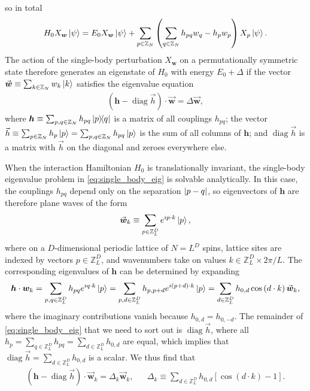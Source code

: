\documentclass[nofootinbib,notitlepage,11pt]{revtex4-2}
\newcommand{\p}[1]{\left(#1\right)} %
\renewcommand{\sp}[1]{\left[#1\right]} %
\renewcommand{\c}{\cdot} %
\newcommand{\m}{\bm} %
\renewcommand{\v}{\vec} %
\newcommand{\1}{\mathds{1}}
\newcommand{\ZZ}{\mathbb{Z}}
\DeclareMathOperator{\diag}{diag}
\begin{document}
so in total
\begin{align}
  H_0 X_{\m w} \ket\psi
  = E_0 X_{\m w} \ket\psi
  + \sum_{p\in\ZZ_N} \p{\sum_{q\in\ZZ_N} h_{pq} w_q - h_p w_p}
  X_p \ket\psi.
  \label{eq:single_body_diagnosis_end}
\end{align}
The action of the single-body perturbation $X_{\m w}$ on a
permutationally symmetric state therefore generates an eigenstate of
$H_0$ with energy $E_0+\Delta$ if the vector
$\v{\m w}\equiv\sum_{k\in\ZZ_N} w_k \ket{k}$ satisfies the eigenvalue
equation
\begin{align}
  \p{\m h - \diag\v h} \c \v{\m w} = \Delta \v{\m w},
  \label{eq:single_body_eig}
\end{align}
where $\m h\equiv\sum_{p,q\in\ZZ_N} h_{pq} \op{p}{q}$ is a matrix of
all couplings $h_{pq}$; the vector
$\v h \equiv \sum_{p\in\ZZ_N} h_p \ket{p} = \sum_{p,q\in\ZZ_N} h_{pq}
\ket{p}$ is the sum of all columns of $\m h$; and $\diag\v h$ is a
matrix with $\v h$ on the diagonal and zeroes everywhere else.

When the interaction Hamiltonian $H_0$ is translationally invariant,
the single-body eigenvalue problem in \eqref{eq:single_body_eig} is
solvable analytically.  In this case, the couplings $h_{pq}$ depend
only on the separation $\abs{p-q}$, so eigenvectors of $\m h$ are
therefore plane waves of the form
\begin{align}
  \v{\m w}_k \equiv \sum_{p\in\ZZ_L^D} e^{ip\c k} \ket{p},
\end{align}
where on a $D$-dimensional periodic lattice of $N=L^D$ spins, lattice
sites are indexed by vectors $p\in\ZZ_L^D$, and wavenumbers take on
values $k\in\ZZ_L^D\times2\pi/L$.  The corresponding eigenvalues of
$\m h$ can be determined by expanding
\begin{align}
  \m h\c{\m w}_k
  = \sum_{p,q\in\ZZ_L^D} h_{pq} e^{iq\c k} \ket{p}
  = \sum_{p,d\in\ZZ_L^D} h_{p,p+d} e^{i\p{p+d}\c k} \ket{p}
  = \sum_{d\in\ZZ_L^D} h_{0,d} \cos\p{d\c k} \v{\m w}_k,
\end{align}
where the imaginary contributions vanish because $h_{0,d}=h_{0,-d}$.
The remainder of \eqref{eq:single_body_eig} that we need to sort out
is $\diag\v h$, where all
$h_p=\sum_{q\in\ZZ_L^D}h_{pq}=\sum_{d\in\ZZ_L^D}h_{0,d}$ are equal,
which implies that $\diag\v h=\sum_{d\in\ZZ_L^D}h_{0,d}$ is a scalar.
We thus find that
\begin{align}
  \p{\m h - \diag\v h}\c\v{\m w}_k = \Delta_k \v{\m w}_k,
  &&
  \Delta_k \equiv \sum_{d\in\ZZ_L^D} h_{0,d} \sp{\cos\p{d\c k}-1}.
\end{align}
\end{document}
